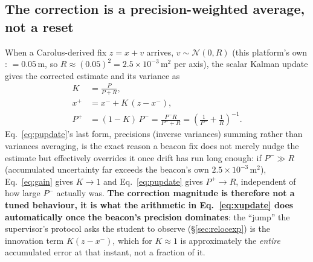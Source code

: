 \subsection{The correction is a precision-weighted average, not a reset}
\label{sec:kalmanfix}
When a Carolus-derived fix $z = x + v$ arrives, $v\sim\mathcal N(0,R)$ (this
platform's own : $=0.05$\,m, so
$R\approx(0.05)^2 = 2.5\times10^{-3}\,\text{m}^2$ per axis), the scalar
Kalman update gives the corrected estimate and its variance as
\begin{align}
K &= \frac{P}{P+R}, \label{eq:gain}\\
x^{+} &= x^{-} + K\,(z - x^{-}), \label{eq:xupdate}\\
P^{+} &= (1-K)\,P^{-} = \frac{P^{-} R}{P^{-}+R}
      = \left(\frac{1}{P^{-}} + \frac{1}{R}\right)^{-1}. \label{eq:pupdate}
\end{align}
Eq.~\ref{eq:pupdate}'s last form, precisions (inverse variances) summing
rather than variances averaging, is the exact reason a beacon fix does not
merely nudge the estimate but effectively overrides it once drift has run
long enough: if $P^{-}\gg R$ (accumulated uncertainty far exceeds the
beacon's own $2.5\times10^{-3}\,\text{m}^2$), Eq.~\ref{eq:gain} gives
$K\to 1$ and Eq.~\ref{eq:pupdate} gives $P^{+}\to R$, independent of how
large $P^{-}$ actually was. \textbf{The correction magnitude is therefore
not a tuned behaviour, it is what the arithmetic in Eq.~\ref{eq:xupdate} does
automatically once the beacon's precision dominates}: the ``jump'' the
supervisor's protocol asks the student to observe (\S\ref{sec:relocexp}) is
the innovation term $K(z-x^{-})$, which for $K\approx1$ is approximately the
\emph{entire} accumulated error at that instant, not a fraction of it.

